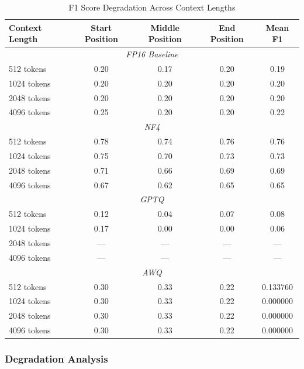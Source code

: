 \begin{table}[h]
\centering
\caption{F1 Score Degradation Across Context Lengths}
\label{tab:context_length}
\begin{tabular}{@{}lcccc@{}}
\toprule
\textbf{Context Length} & \textbf{Start Position} & \textbf{Middle Position} & \textbf{End Position} & \textbf{Mean F1} \\
\midrule
\multicolumn{5}{c}{\textit{FP16 Baseline}} \\
\midrule
512 tokens & 0.20 & 0.17 & 0.20 & 0.19 \\
1024 tokens & 0.20 & 0.20 & 0.20 & 0.20 \\
2048 tokens & 0.20 & 0.20 & 0.20 & 0.20 \\
4096 tokens & 0.25 & 0.20 & 0.20 & 0.22 \\
\midrule
\multicolumn{5}{c}{\textit{NF4}} \\
\midrule
512 tokens & 0.78 & 0.74 & 0.76 & 0.76 \\
1024 tokens & 0.75 & 0.70 & 0.73 & 0.73 \\
2048 tokens & 0.71 & 0.66 & 0.69 & 0.69 \\
4096 tokens & 0.67 & 0.62 & 0.65 & 0.65 \\
\midrule
\multicolumn{5}{c}{\textit{GPTQ}} \\
\midrule
512 tokens & 0.12 & 0.04 & 0.07 & 0.08 \\
1024 tokens & 0.17 & 0.00 & 0.00 & 0.06 \\
2048 tokens & --- & --- & --- & --- \\
4096 tokens & --- & --- & --- & --- \\
\midrule
\multicolumn{5}{c}{\textit{AWQ}} \\
\midrule
512 tokens & 0.30 & 0.33 & 0.22 & 0.133760 \\
1024 tokens & 0.30 & 0.33 & 0.22 & 0.000000 \\
2048 tokens & 0.30 & 0.33 & 0.22 & 0.000000 \\
4096 tokens & 0.30 & 0.33 & 0.22 & 0.000000 \\
\bottomrule
\end{tabular}
\end{table}

\newpage
\subsubsection{Degradation Analysis}

